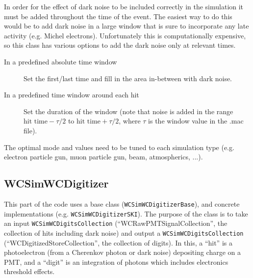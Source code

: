 In order for the effect of dark noise to be included correctly in the simulation it must be added throughout the time of the event. The easiest way to do this would be to add dark noise in a large window that is sure to incorporate any late activity (e.g. Michel electrons). Unfortunately this is computationally expensive, so this class has various options to add the dark noise only at relevant times.
\begin{description}
\item[In a predefined absolute time window] Set the first/last time and fill in the area in-between with dark noise.
\item[In a predefined time window around each hit] Set the duration of the window (note that noise is added in the range $\textrm{hit time} - \tau/2$ to $\textrm{hit time} + \tau/2$, where $\tau$ is the window value in the .mac file).
\end{description}
The optimal mode and values need to be tuned to each simulation type (e.g. electron particle gun, muon particle gun, beam, atmospherics, ...).

\subsection{WCSimWCDigitizer}
\label{sec:daq:digitizer}

This part of the code uses a base class (\texttt{WCSimWCDigitizerBase}), and concrete implementations (e.g. \texttt{WCSimWCDigitizerSKI}). The purpose of the class is to take an input \texttt{WCSimWCDigitsCollection} (``WCRawPMTSignalCollection'', the collection of hits including dark noise) and output a \texttt{WCSimWCDigitsCollection} (``WCDigitizedStoreCollection'', the collection of digits). In this, a ``hit'' is a photoelectron (from a Cherenkov photon or dark noise) depositing charge on a PMT, and  a ``digit'' is an integration of photons which includes electronics threshold effects.

